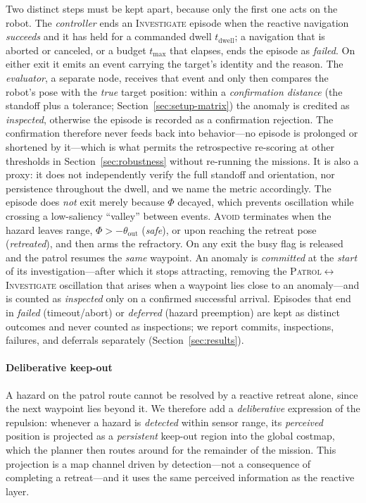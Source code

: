 Two distinct steps must be kept apart, because only the first one acts on the
robot. The \emph{controller} ends an \textsc{Investigate} episode when the
reactive navigation \emph{succeeds} and it has held for a commanded dwell
$t_{\text{dwell}}$; a navigation that is aborted or canceled, or a budget
$t_{\max}$ that elapses, ends the episode as \emph{failed}. On either exit it
emits an event carrying the target's identity and the reason. The
\emph{evaluator}, a separate node, receives that event and only then compares the
robot's pose with the \emph{true} target position: within a \emph{confirmation
distance} (the standoff plus a tolerance; Section~\ref{sec:setup-matrix}) the
anomaly is credited as \emph{inspected}, otherwise the episode is recorded as a
confirmation rejection. The confirmation therefore never feeds back into
behavior---no episode is prolonged or shortened by it---which is what permits the
retrospective re-scoring at other thresholds in Section~\ref{sec:robustness}
without re-running the missions. It is also a proxy: it does not independently
verify the full standoff and orientation, nor persistence throughout the dwell,
and we name the metric accordingly. The episode does
\emph{not} exit merely because $\Phi$ decayed, which prevents oscillation while
crossing a low-saliency ``valley'' between events. \textsc{Avoid} terminates when
the hazard leaves range, $\Phi > -\theta_{\text{out}}$ (\emph{safe}), or upon
reaching the retreat pose (\emph{retreated}), and then arms the refractory. On any
exit the busy flag is released and the patrol resumes the \emph{same} waypoint. An
anomaly is \emph{committed} at the \emph{start} of its investigation---after which
it stops attracting, removing the
\textsc{Patrol}$\leftrightarrow$\textsc{Investigate} oscillation that arises when a
waypoint lies close to an anomaly---and is counted as \emph{inspected} only on a
confirmed successful arrival. Episodes that end in \emph{failed} (timeout/abort) or
\emph{deferred} (hazard preemption) are kept as distinct outcomes and never counted
as inspections; we report commits, inspections, failures, and deferrals separately
(Section~\ref{sec:results}).

\paragraph*{Deliberative keep-out} A hazard on the patrol route cannot be resolved by
a reactive retreat alone, since the next waypoint lies beyond it. We therefore add a
\emph{deliberative} expression of the repulsion: whenever a hazard is \emph{detected}
within sensor range, its \emph{perceived} position is projected as a \emph{persistent}
keep-out region into the global costmap, which the planner then routes around for the
remainder of the mission. This projection is a map channel driven by detection---not
a consequence of completing a retreat---and it uses the same perceived information as
the reactive layer.

